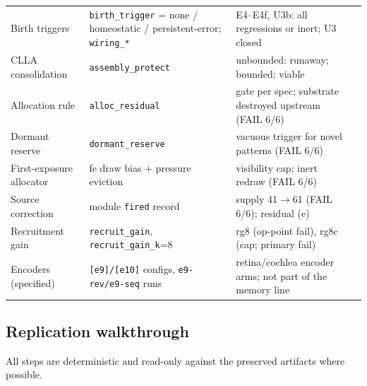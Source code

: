 \begin{center}
\begin{tabular}{p{3.3cm}p{3.0cm}p{5.2cm}p{3.2cm}}
Birth triggers & \texttt{birth\_trigger} = none / homeostatic / persistent-error; \texttt{wiring\_*} & E4--E4f, U3b: all regressions or inert; U3 closed & \cite{e4proto} \\
CLLA consolidation & \texttt{assembly\_protect} & unbounded: runaway; bounded: viable & \cite{cllarecord,bbounded} \\
Allocation rule & \texttt{alloc\_residual} & gate per spec; substrate destroyed upstream (FAIL 6/6) & \cite{rule} \\
Dormant reserve & \texttt{dormant\_reserve} & vacuous trigger for novel patterns (FAIL 6/6) & \cite{reserve} \\
First-exposure allocator & fe draw bias + pressure eviction & visibility cap; inert redraw (FAIL 6/6) & \cite{fe} \\
Source correction & module \texttt{fired} record & supply 41\(\to\)61 (FAIL 6/6); residual (e) & \cite{fec} \\
Recruitment gain & \texttt{recruit\_gain}, \texttt{recruit\_gain\_k}=8 & rg8 (op-point fail), rg8c (cap; primary fail) & \cite{rg8,rg8c} \\
Encoders (specified) & \texttt{[e9]/[e10]} configs, \texttt{e9-rev/e9-seq} runs & retina/cochlea encoder arms; not part of the memory line & \cite{overview} \\
\bottomrule
\end{tabular}
\end{center}

\subsection{Replication walkthrough}

All steps are deterministic and read-only against the preserved
artifacts where possible.

